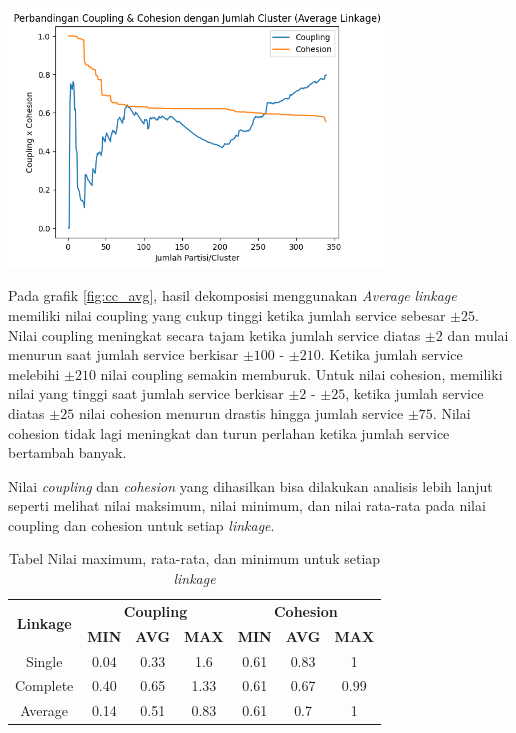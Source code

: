\begin{center}
	\includegraphics[width=10cm]{img/bab_4/cc_avg.png}
	\label{fig:cc_avg}
\end{center}

Pada grafik \ref{fig:cc_avg}, hasil dekomposisi menggunakan \textit{Average} \textit{linkage} memiliki nilai coupling yang cukup tinggi ketika jumlah service sebesar  $\pm 25$. Nilai coupling meningkat secara tajam ketika jumlah service diatas  $\pm 2$ dan mulai menurun saat jumlah service berkisar  $\pm 100$ - $\pm 210$. Ketika jumlah service melebihi  $\pm 210$ nilai coupling semakin memburuk. Untuk nilai cohesion, memiliki nilai yang tinggi saat jumlah service berkisar  $\pm 2$ -  $\pm 25$, ketika jumlah service diatas  $\pm 25$ nilai cohesion menurun drastis hingga jumlah service  $\pm 75$. Nilai cohesion tidak lagi meningkat dan turun perlahan ketika jumlah service bertambah banyak.

Nilai \textit{coupling} dan \textit{cohesion} yang dihasilkan bisa dilakukan analisis lebih lanjut seperti melihat nilai maksimum, nilai minimum, dan nilai rata-rata pada nilai coupling dan cohesion untuk setiap \textit{linkage}.

\begin{table}[ht]
\centering
\begin{tabular}{|c|c|c|c|c|c|c|}
\hline
\multirow{2}{*}{\textbf{Linkage}} & \multicolumn{3}{c|}{\textbf{Coupling}} & \multicolumn{3}{c|}{\textbf{Cohesion}} \\
\cline{2-7}
&  \textbf{MIN} & \textbf{AVG} &  \textbf{MAX} &  \textbf{MIN} &  \textbf{AVG} & \textbf{MAX} \\
\hline
Single & 0.04 & 0.33 & 1.6    & 0.61 & 0.83 & 1 \\
Complete & 0.40 & 0.65 & 1.33 & 0.61 & 0.67 & 0.99 \\
Average & 0.14 & 0.51 & 0.83  & 0.61 & 0.7  & 1 \\
\hline
\end{tabular}
\caption{Tabel  Nilai maximum, rata-rata, dan minimum untuk setiap \textit{linkage}}
\label{tab:link_stat}
\end{table}

